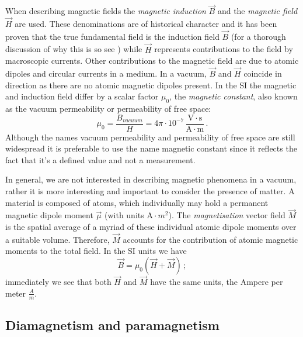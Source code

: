 When describing magnetic fields the \textit{magnetic induction} $\vec{B}$ and the \textit{magnetic field} $\vec{H}$ are used. These denominations are of historical character and it has been proven that the true fundamental field is the induction field $\vec{B}$ (for a thorough discussion of why this is so see \citet{Feynman}) while $\vec{H}$ represents contributions to the field by macroscopic currents. Other contributions to the magnetic field are due to atomic dipoles and circular currents in a medium. In a vacuum, $\vec{B}$ and $\vec{H}$ coincide in direction as there are no atomic magnetic dipoles present. In the SI the magnetic and induction field differ by a scalar factor $\mu_0$, the \textit{magnetic constant}, also known as the vacuum permeability or permeability of free space:
\begin{equation}
\mu_0 = \frac{B_{\textit{vacuum}}}{H} = 4 \pi \cdot 10^{-7} \, \frac{\mathrm{V}\cdot\mathrm{s}}{\mathrm{A}\cdot\mathrm{m}} \, .
\end{equation}
Although the names vacuum permeability and permeability of free space are still widespread it is preferable to use the name magnetic constant since it reflects the fact that it's a defined value and not a measurement.\par

In general, we are not interested in describing magnetic phenomena in a vacuum, rather it is more interesting and important to consider the presence of matter. A material is composed of atoms, which individually may hold a permanent magnetic dipole moment $\vec{\mu}$ (with units $\mathrm{A}\cdot m^2$). The \textit{magnetisation} vector field $\vec{M}$ is the spatial average of a myriad of these individual atomic dipole moments over a suitable volume. Therefore, $\vec{M}$ accounts for the contribution of atomic magnetic moments to the total field. In the SI units we have
\begin{equation}
\vec{B} = \mu_0 (\vec{H}+\vec{M})\, ;
\end{equation}
immediately we see that both $\vec{H}$ and $\vec{M}$ have the same units, the Ampere per meter $\frac{A}{m}$.

\subsection{Diamagnetism and paramagnetism}

